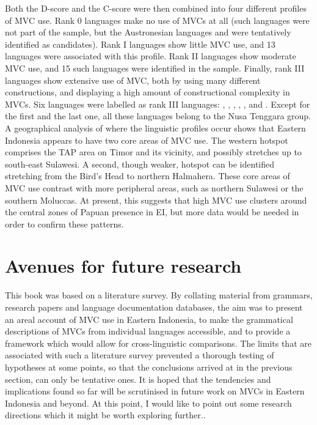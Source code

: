 Both the D-score and the C-score were then combined into four different profiles of MVC use. Rank 0 languages make no use of MVCs at all (such languages were not part of the sample, but the Austronesian languages  and  were tentatively identified as candidates). Rank I languages show little MVC use, and 13 languages were associated with this profile. Rank II languages show moderate MVC use, and 15 such languages were identified in the sample. Finally, rank III languages show extensive use of MVC, both by using many different constructions, and displaying a high amount of constructional complexity in MVCs. Six languages were labelled as rank III languages: , , , , , and . Except for the first and the last one, all these languages belong to the Nusa Tenggara group. A geographical analysis of where the linguistic profiles occur shows that Eastern Indonesia appears to have two core areas of MVC use. The western hotspot comprises the TAP area on Timor and its vicinity, and possibly stretches up to south-east Sulawesi. A second, though weaker, hotspot can be identified stretching from the Bird's Head to northern Halmahera. These core areas of MVC use contrast with more peripheral areas, such as northern Sulawesi or the southern Moluccas. At present, this suggests that high MVC use clusters around the central zones of Papuan presence in EI, but more data would be needed in order to confirm these patterns.

\section{Avenues for future research}

This book was based on a literature survey. By collating material from grammars, research papers and language documentation databases, the aim was to present an areal account of MVC use in Eastern Indonesia, to make the grammatical descriptions of MVCs from individual languages accessible, and to provide a framework which would allow for cross-linguistic comparisons. The limits that are associated with such a literature survey prevented a thorough testing of hypotheses at some points, so that the conclusions arrived at in the previous section, can only be tentative ones. It is hoped that the tendencies and implications found so far will be scrutinised in future work on MVCs in Eastern Indonesia and beyond. At this point, I would like to point out some research directions which it might be worth exploring further..

